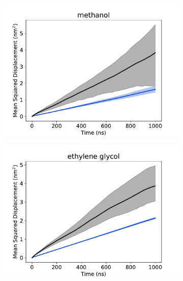 \documentclass[journal=jpcbfk,manuscript=article]{achemso}
\begin{document}
  \begin{figure}
  \centering
  \begin{subfigure}{0.45\textwidth}
  \includegraphics[width=\textwidth]{msd_MET.pdf}
  \caption{}\label{fig:msd_MET}
  \end{subfigure}
  \begin{subfigure}{0.45\textwidth}
  \includegraphics[width=\textwidth]{msd_GCL.pdf}
  \caption{}\label{fig:msd_GCL}
  \end{subfigure}
  \begin{subfigure}{0.45\textwidth}

\end{subfigure}
\end{figure}
\end{document}
